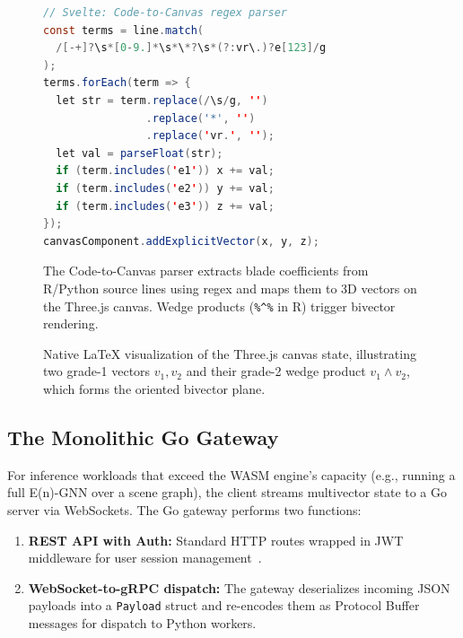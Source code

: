 \documentclass[conference]{IEEEtran}
\begin{document}
\begin{figure}[htbp]
\begin{lstlisting}[language=Java]
// Svelte: Code-to-Canvas regex parser
const terms = line.match(
  /[-+]?\s*[0-9.]*\s*\*?\s*(?:vr\.)?e[123]/g
);
terms.forEach(term => {
  let str = term.replace(/\s/g, '')
                .replace('*', '')
                .replace('vr.', '');
  let val = parseFloat(str);
  if (term.includes('e1')) x += val;
  if (term.includes('e2')) y += val;
  if (term.includes('e3')) z += val;
});
canvasComponent.addExplicitVector(x, y, z);
\end{lstlisting}
\caption{The Code-to-Canvas parser extracts blade coefficients from R/Python source lines using regex and maps them to 3D vectors on the Three.js canvas. Wedge products (\texttt{\%\string^\%} in R) trigger bivector rendering.}
\label{fig:parser}
\end{figure}

\begin{figure}[htbp]
\centering
{}
\caption{Native LaTeX visualization of the Three.js canvas state, illustrating two grade-1 vectors $v_1, v_2$ and their grade-2 wedge product $v_1 \wedge v_2$, which forms the oriented bivector plane.}
\label{fig:ui}
\end{figure}

\subsection{The Monolithic Go Gateway}
For inference workloads that exceed the WASM engine's capacity (e.g., running a full E(n)-GNN over a scene graph), the client streams multivector state to a Go server via WebSockets. The Go gateway performs two functions:
\begin{enumerate}
    \item \textbf{REST API with Auth:} Standard HTTP routes wrapped in JWT middleware for user session management~\cite{b_jwt}.
    \item \textbf{WebSocket-to-gRPC dispatch:} The gateway deserializes incoming JSON payloads into a \texttt{Payload} struct and re-encodes them as Protocol Buffer messages for dispatch to Python workers.
\end{enumerate}
\end{document}
